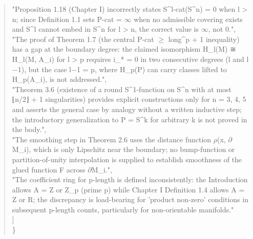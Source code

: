 \documentclass[11pt]{article}
\begin{document}
\begin{quote}
    "Proposition 1.18 (Chapter I) incorrectly states S\^{}l-cat(S\^{}n) = 0 when l > n; since Definition 1.1 sets P-cat = \ensuremath{\infty} when no admissible covering exists and S\^{}l cannot embed in S\^{}n for l > n, the correct value is \ensuremath{\infty}, not 0.",\\
    "The proof of Theorem 1.7 (the central P-cat \ensuremath{\ge} long\^{}p + 1 inequality) has a gap at the boundary degree: the claimed isomorphism H\_l(M) ≅ H\_l(M, A\_i) for l > p requires i\_* = 0 in two consecutive degrees (l and l\ensuremath{-}1), but the case l\ensuremath{-}1 = p, where H\_p(P) can carry classes lifted to H\_p(A\_i), is not addressed.",\\
    "Theorem 3.6 (existence of a round S\^{}1-function on S\^{}n with at most ⌊n/2⌋ + 1 singularities) provides explicit constructions only for n = 3, 4, 5 and asserts the general case by analogy without a written inductive step; the introductory generalization to P = S\^{}k for arbitrary k is not proved in the body.",\\
    "The smoothing step in Theorem 2.6 uses the distance function \ensuremath{\rho}(x, \ensuremath{\partial}M\_i), which is only Lipschitz near the boundary; no bump-function or partition-of-unity interpolation is supplied to establish smoothness of the glued function F across \ensuremath{\partial}M\_i.",\\
    "The coefficient ring for p-length is defined inconsistently: the Introduction allows A = Z or Z\_p (prime p) while Chapter I Definition 1.4 allows A = Z or R; the discrepancy is load-bearing for 'product non-zero' conditions in subsequent p-length counts, particularly for non-orientable manifolds."\\
  ]\\
\}\\
\end{quote}
\end{document}
